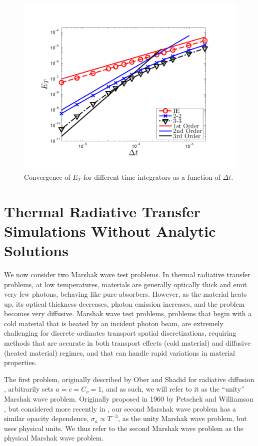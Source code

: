 \begin{figure}[!htp]
\centering
\includegraphics[width=12cm,trim=0.25in  0.2in 0.75in 0.5in,clip=true]{chapter6_grey_radtran/Dissertation_Data/Time_Integrators_Convergence_Temperature.pdf}
\caption{Convergence of $E_{T}$ for different time integrators as a function of $\Delta t$.}
\label{fig:big_dt}
\end{figure}

\pagebreak

\section{Thermal Radiative Transfer Simulations Without Analytic Solutions}
\label{sec:marshak_waves}

We now consider two Marshak wave test problems.
In thermal radiative transfer problems, at low temperatures, materials are generally optically thick and emit very few photons, behaving like pure absorbers.
However, as the material heats up, its optical thickness decreases, photon emission increases, and the problem becomes very diffusive.
Marshak wave test problems, problems that begin with a cold material that is heated by an incident photon beam, are extremely challenging for discrete ordinates transport spatial discretizations, requiring methods that are accurate in both transport effects (cold material) and diffusive (heated material) regimes, and that can handle rapid variations in material properties.

The first problem, originally described by Ober and Shadid for radiative diffusion \cite{ober_shadid}, arbitrarily sets $a=c=C_v=1$, and as such, we will refer to it as the ``unity'' Marshak wave problem. 
Originally proposed in 1960 by Petschek and Williamson \cite{physical_marshak}, but considered more recently in \cite{negative_trt,time_adaptive_diffusion}, our second Marshak wave problem has a similar opacity dependence, $\sigma_a \propto T^{-3}$, as the unity Marshak wave problem, but uses physical units.  
We thus refer to the second Marshak wave problem as the physical Marshak wave problem.

